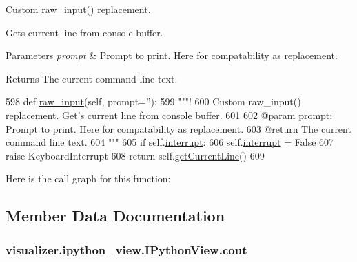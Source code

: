 Custom \hyperlink{classvisualizer_1_1ipython__view_1_1IPythonView_a2d725299a1a2ba91356404a914c63f43}{raw\+\_\+input()} replacement. 

Get\textquotesingle{}s current line from console buffer.


\begin{DoxyParams}{Parameters}
{\em prompt} & Prompt to print. Here for compatability as replacement. \\
\hline
\end{DoxyParams}
\begin{DoxyReturn}{Returns}
The current command line text. 
\end{DoxyReturn}

\begin{DoxyCode}
598   \textcolor{keyword}{def }\hyperlink{classvisualizer_1_1ipython__view_1_1IPythonView_a2d725299a1a2ba91356404a914c63f43}{raw\_input}(self, prompt=''):
599     \textcolor{stringliteral}{"""!}
600 \textcolor{stringliteral}{    Custom raw\_input() replacement. Get's current line from console buffer.}
601 \textcolor{stringliteral}{    }
602 \textcolor{stringliteral}{    @param prompt: Prompt to print. Here for compatability as replacement.}
603 \textcolor{stringliteral}{    @return The current command line text.}
604 \textcolor{stringliteral}{    """}
605     \textcolor{keywordflow}{if} self.\hyperlink{classvisualizer_1_1ipython__view_1_1IPythonView_ad3937b08cb14ec5390c2e0101952765e}{interrupt}:
606       self.\hyperlink{classvisualizer_1_1ipython__view_1_1IPythonView_ad3937b08cb14ec5390c2e0101952765e}{interrupt} = \textcolor{keyword}{False}
607       \textcolor{keywordflow}{raise} KeyboardInterrupt
608     \textcolor{keywordflow}{return} self.\hyperlink{classvisualizer_1_1ipython__view_1_1ConsoleView_a7532653c420d8ff9797f7dc3a0fa3548}{getCurrentLine}()
609 
\end{DoxyCode}


Here is the call graph for this function\+:




\subsection{Member Data Documentation}
\subsubsection[{\texorpdfstring{cout}{cout}}]{\setlength{\rightskip}{0pt plus 5cm}visualizer.\+ipython\+\_\+view.\+I\+Python\+View.\+cout}\hypertarget{classvisualizer_1_1ipython__view_1_1IPythonView_a40ca2f04484b822de44a2d95816d189e}{}\label{classvisualizer_1_1ipython__view_1_1IPythonView_a40ca2f04484b822de44a2d95816d189e}


